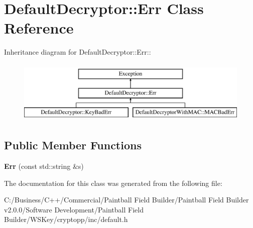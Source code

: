 \hypertarget{class_default_decryptor_1_1_err}{
\section{DefaultDecryptor::Err Class Reference}
\label{class_default_decryptor_1_1_err}
}
Inheritance diagram for DefaultDecryptor::Err::\begin{figure}[H]
\begin{center}
\leavevmode
\includegraphics[height=3cm]{class_default_decryptor_1_1_err}
\end{center}
\end{figure}
\subsection*{Public Member Functions}
\begin{DoxyCompactItemize}
\item 
\hypertarget{class_default_decryptor_1_1_err_aecce31c0f10a51ab27bff44f61bf8f14}{
{\bfseries Err} (const std::string \&s)}
\label{class_default_decryptor_1_1_err_aecce31c0f10a51ab27bff44f61bf8f14}

\end{DoxyCompactItemize}


The documentation for this class was generated from the following file:\begin{DoxyCompactItemize}
\item 
C:/Business/C++/Commercial/Paintball Field Builder/Paintball Field Builder v2.0.0/Software Development/Paintball Field Builder/WSKey/cryptopp/inc/default.h\end{DoxyCompactItemize}
